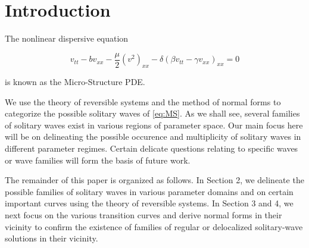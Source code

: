\section{Introduction}

The nonlinear dispersive equation \cite{Roy1}
 

\begin{equation}\label{eq:MS}
v_{tt} - b v_{xx} - \frac{\mu}{2} \left( v^2 \right)_{xx} - \delta \left( \beta v_{tt} - \gamma v_{xx}\right)_{xx} = 0 
\end{equation}

is known as the Micro-Structure PDE. 


We use the theory of reversible systems and the method of normal forms to categorize the possible solitary waves of \eqref{eq:MS}.
As we shall see, several families of solitary waves exist in various regions of parameter space. Our main focus here will be on 
delineating the possible occurence and multiplicity of solitary waves in different parameter regimes. Certain delicate questions
relating to specific waves or wave families will form the basis of future work. 

The remainder of this paper is organized as follows. In Section 2, we delineate the possible families of solitary waves
in various parameter domains and on certain important curves using the theory of reversible systems. In Section 3 and 4, we next
focus on the various transition curves and derive normal forms in their vicinity to confirm the existence of families of 
regular or delocalized solitary-wave solutions in their vicinity.
